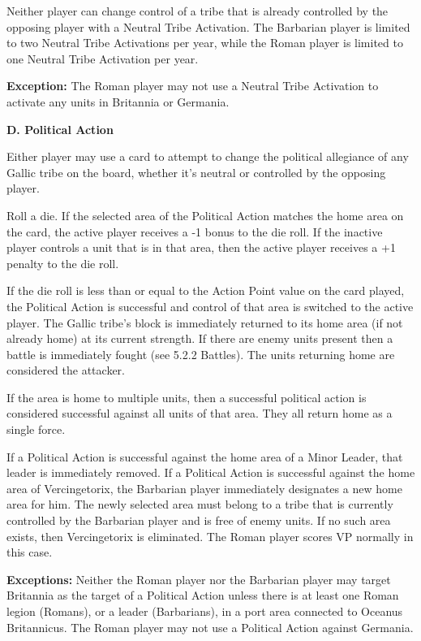 Neither player can change control of a tribe that is already controlled by the opposing player with a Neutral Tribe Activation. The Barbarian player is limited to two Neutral Tribe Activations per year, while the Roman player is limited to one Neutral Tribe Activation per year.

\textbf{Exception:} The Roman player may not use a Neutral Tribe Activation to activate any units in Britannia or Germania.

\label{political_action}\textbf{D. Political Action}
\par
Either player may use a card to attempt to change the political allegiance of any Gallic tribe on the board, whether it's neutral or controlled by the opposing player.

Roll a die. If the selected area of the Political Action matches the home area on the card, the active player receives a -1 bonus to the die roll. If the inactive player controls a unit that is in that area, then the active player receives a +1 penalty to the die roll.

If the die roll is less than or equal to the Action Point value on the card played, the Political Action is successful and control of that area is switched to the active player. The Gallic tribe's block is immediately returned to its home area (if not already home) at its current strength. If there are enemy units present then a battle is immediately fought (see 5.2.2 Battles). The units returning home are considered the attacker.

If the area is home to multiple units, then a successful political action is considered successful against all units of that area. They all return home as a single force.

If a Political Action is successful against the home area of a Minor Leader, that leader is immediately removed. If a Political Action is successful  against the home area of Vercingetorix, the Barbarian player immediately designates a new home area for him. The newly selected area must belong to a tribe that is currently controlled by the Barbarian player and is free of enemy units. If no such area exists, then Vercingetorix is eliminated. The Roman player scores VP normally in this case.

\textbf{Exceptions:} Neither the Roman player nor the Barbarian player may target Britannia as the target of a Political Action unless there is at least one Roman legion (Romans), or a leader (Barbarians), in a port area connected to Oceanus Britannicus. The Roman player may not use a Political Action against Germania.

